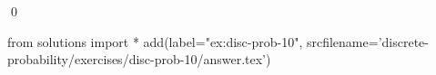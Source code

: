 
\begin{ex} 
  \label{ex:disc-prob-10}
  
  \qed
\end{ex} 
\begin{python0}
from solutions import *
add(label="ex:disc-prob-10",
    srcfilename='discrete-probability/exercises/disc-prob-10/answer.tex') 
\end{python0}
